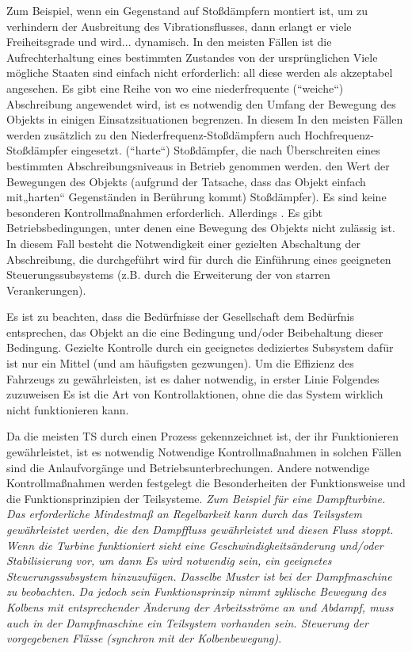 \documentclass[11pt,a4paper]{article}
\begin{document}
\begin{emph}  
  Zum Beispiel, wenn ein Gegenstand auf Stoßdämpfern montiert ist, um zu
  verhindern der Ausbreitung des Vibrationsflusses, dann erlangt er viele
  Freiheitsgrade und wird...  dynamisch. In den meisten Fällen ist die
  Aufrechterhaltung eines bestimmten Zustandes von der ursprünglichen Viele
  mögliche Staaten sind einfach nicht erforderlich: all diese werden als
  akzeptabel angesehen. Es gibt eine Reihe von wo eine niederfrequente
  (“weiche“) Abschreibung angewendet wird, ist es notwendig den Umfang der
  Bewegung des Objekts in einigen Einsatzsituationen begrenzen. In diesem In
  den meisten Fällen werden zusätzlich zu den Niederfrequenz-Stoßdämpfern auch
  Hochfrequenz-Stoßdämpfer eingesetzt.  (“harte“) Stoßdämpfer, die nach
  Überschreiten eines bestimmten Abschreibungsniveaus in Betrieb genommen
  werden.  den Wert der Bewegungen des Objekts (aufgrund der Tatsache, dass
  das Objekt einfach mit„harten“ Gegenständen in Berührung kommt)
  Stoßdämpfer). Es sind keine besonderen Kontrollmaßnahmen
  erforderlich. Allerdings .  Es gibt Betriebsbedingungen, unter denen eine
  Bewegung des Objekts nicht zulässig ist.  In diesem Fall besteht die
  Notwendigkeit einer gezielten Abschaltung der Abschreibung, die durchgeführt
  wird für durch die Einführung eines geeigneten Steuerungssubsystems
  (z.B. durch die Erweiterung der von starren Verankerungen).
\end{emph}

Es ist zu beachten, dass die Bedürfnisse der Gesellschaft dem Bedürfnis
entsprechen, das Objekt an die eine Bedingung und/oder Beibehaltung dieser
Bedingung. Gezielte Kontrolle durch ein geeignetes dediziertes Subsystem dafür
ist nur ein Mittel (und am häufigsten gezwungen). Um die Effizienz des
Fahrzeugs zu gewährleisten, ist es daher notwendig, in erster Linie Folgendes
zuzuweisen Es ist die Art von Kontrollaktionen, ohne die das System wirklich
nicht funktionieren kann.

Da die meisten TS durch einen Prozess gekennzeichnet ist, der ihr
Funktionieren gewährleistet, ist es notwendig Notwendige Kontrollmaßnahmen in
solchen Fällen sind die Anlaufvorgänge und Betriebsunterbrechungen. Andere
notwendige Kontrollmaßnahmen werden festgelegt die Besonderheiten der
Funktionsweise und die Funktionsprinzipien der Teilsysteme. \emph{Zum Beispiel
  für eine Dampfturbine.  Das erforderliche Mindestmaß an Regelbarkeit kann
  durch das Teilsystem gewährleistet werden, die den Dampffluss gewährleistet
  und diesen Fluss stoppt. Wenn die Turbine funktioniert sieht eine
  Geschwindigkeitsänderung und/oder Stabilisierung vor, um dann Es wird
  notwendig sein, ein geeignetes Steuerungssubsystem hinzuzufügen.  Dasselbe
  Muster ist bei der Dampfmaschine zu beobachten. Da jedoch sein
  Funktionsprinzip nimmt zyklische Bewegung des Kolbens mit entsprechender
  Änderung der Arbeitsströme an und Abdampf, muss auch in der Dampfmaschine
  ein Teilsystem vorhanden sein.  Steuerung der vorgegebenen Flüsse (synchron
  mit der Kolbenbewegung)}.
\end{document}
